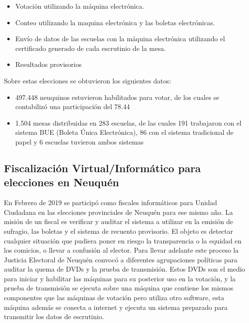 \begin{itemize}
    \item Votación utilizando la máquina electrónica.
    \item Conteo utilizando la maquina electrónica y las boletas electrónicas.
    \item Envío de datos de las escuelas con la máquina electrónica utilizando el certificado generado de cada escrutinio de la mesa.
    \item Resultados provisorios
\end{itemize}

\newline Sobre estas elecciones se obtuvieron los siguientes datos:
\begin{itemize}
    \item 497.448 neuquinos estuvieron habilitados para votar, de los cuales se contabilizó una participación del 78.44%
    \item 1.504 mesas distribuidas en 283 escuelas, de las cuales 191 trabajaron con el sistema BUE (Boleta Única Electrónica), 86 con el sistema tradicional de papel y 6 escuelas tuvieron ambos sistemas
\end{itemize}

\subsection{Fiscalización Virtual/Informático para elecciones en Neuquén}
En Febrero de 2019 se participó como fiscales informáticos para Unidad Ciudadana en las elecciones provinciales de Neuquén para ese mismo año. La misión de un fiscal es verificar y auditar el sistema a utilizar en la emisión de sufragio, las boletas y el sistema de recuento provisorio. El objeto es detectar cualquier situación que pudiera poner en riesgo la transparencia o la equidad en los comicios, o llevar a confusión al elector. Para llevar adelante este proceso la Justicia Electoral de Neuquén convocó a diferentes agrupaciones políticas para auditar la quema de DVDs y la prueba de transmisión. Estos DVDs son el medio para iniciar y habilitar las máquinas para su posterior uso en la votación, y la prueba de transmisión se ejecuta sobre una máquina que contiene los mismos componentes que las máquinas de votación pero utiliza otro software, esta máquina además se conecta a internet y ejecuta un sistema preparado para transmitir los datos de escrutinio. 

